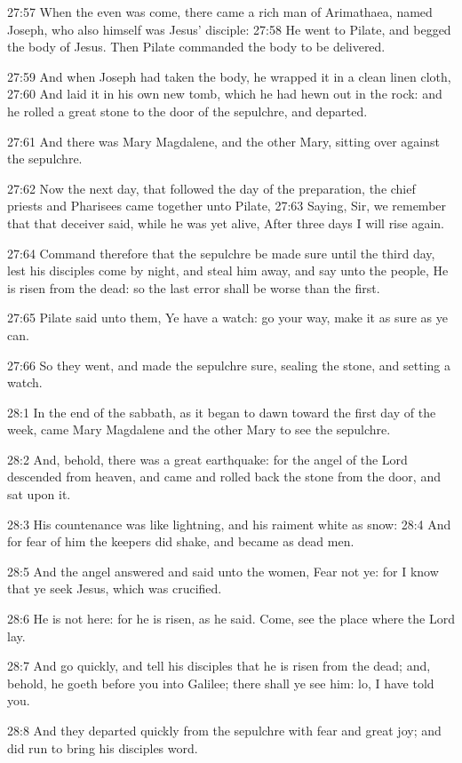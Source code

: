 27:57 When the even was come, there came a rich man of Arimathaea,
named Joseph, who also himself was Jesus' disciple: 27:58 He went to
Pilate, and begged the body of Jesus. Then Pilate commanded the body
to be delivered.

27:59 And when Joseph had taken the body, he wrapped it in a clean
linen cloth, 27:60 And laid it in his own new tomb, which he had hewn
out in the rock: and he rolled a great stone to the door of the
sepulchre, and departed.

27:61 And there was Mary Magdalene, and the other Mary, sitting over
against the sepulchre.

27:62 Now the next day, that followed the day of the preparation, the
chief priests and Pharisees came together unto Pilate, 27:63 Saying,
Sir, we remember that that deceiver said, while he was yet alive,
After three days I will rise again.

27:64 Command therefore that the sepulchre be made sure until the
third day, lest his disciples come by night, and steal him away, and
say unto the people, He is risen from the dead: so the last error
shall be worse than the first.

27:65 Pilate said unto them, Ye have a watch: go your way, make it as
sure as ye can.

27:66 So they went, and made the sepulchre sure, sealing the stone,
and setting a watch.

28:1 In the end of the sabbath, as it began to dawn toward the first
day of the week, came Mary Magdalene and the other Mary to see the
sepulchre.

28:2 And, behold, there was a great earthquake: for the angel of the
Lord descended from heaven, and came and rolled back the stone from
the door, and sat upon it.

28:3 His countenance was like lightning, and his raiment white as
snow: 28:4 And for fear of him the keepers did shake, and became as
dead men.

28:5 And the angel answered and said unto the women, Fear not ye: for
I know that ye seek Jesus, which was crucified.

28:6 He is not here: for he is risen, as he said. Come, see the place
where the Lord lay.

28:7 And go quickly, and tell his disciples that he is risen from the
dead; and, behold, he goeth before you into Galilee; there shall ye
see him: lo, I have told you.

28:8 And they departed quickly from the sepulchre with fear and great
joy; and did run to bring his disciples word.


